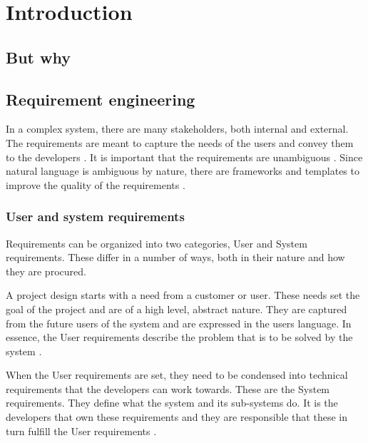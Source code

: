 \chapter{Introduction}
\section{But why}
\section{Requirement engineering}
In a complex system, there are many stakeholders, both internal and external.
The requirements are meant to capture the needs of the users and convey them to
the developers \cite{ibm_req}. It is important that the requirements are
unambiguous \cite{ibm_req, rupp2014}. Since natural language is ambiguous by
nature, there are frameworks and templates to improve the quality of the
requirements \cite{rupp2014}. 

\subsection{User and system requirements}
Requirements can be organized into two categories, User and System requirements.
These differ in a number of ways, both in their nature and how they are
procured.

A project design starts with a need from a customer or user. These needs set the
goal of the project and are of a high level, abstract nature. They are captured
from the future users of the system and are expressed in the users language. In
essence, the User requirements describe the problem that is to be solved by the
system \cite{ibm_req}. 

When the User requirements are set, they need to be condensed into technical
requirements that the developers can work towards. These are the System
requirements. They define what the system and its sub-systems do. It is the
developers that own these requirements and they are responsible that these in
turn fulfill the User requirements \cite{ibm_req}.

